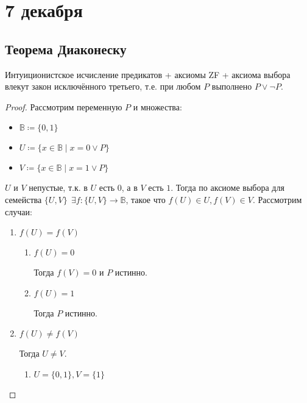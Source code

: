 \chapter{7 декабря}

\section{Теорема Диаконеску}

\begin{theorem}[Диаконеску]
    Интуиционистское исчисление предикатов + аксиомы ZF + аксиома выбора влекут закон исключённого третьего, т.е. при любом \(P\) выполнено \(P \lor \neg P\).
\end{theorem}

\begin{proof}
    Рассмотрим переменную \(P\) и множества:
    \begin{itemize}
        \item \(\mathbb{B} \coloneqq \{0, 1\}\)
        \item \(U \coloneqq \{x \in \mathbb{B} \mid x = 0 \lor P\}\)
        \item \(V \coloneqq \{x \in \mathbb{B} \mid x = 1 \lor P\}\)
    \end{itemize}


    \(U\) и \(V\) непустые, т.к. в \(U\) есть \(0\), а в \(V\) есть \(1\). Тогда по аксиоме выбора для семейства \(\{U, V\} \ \ \exists f : \{U, V\} \to \mathbb{B}\), такое что \(f(U) \in U, f(V) \in V\). Рассмотрим случаи:
    \begin{enumerate}
        \item \(f(U) = f(V)\)
              \begin{enumerate}
                  \item \(f(U) = 0\)

                        Тогда \(f(V) = 0\) и \(P\) истинно.
                  \item \(f(U) = 1\)

                        Тогда \(P\) истинно.
              \end{enumerate}
        \item \(f(U) \neq f(V)\)

              Тогда \(U \neq V\).

              \begin{enumerate}
                  \item \(U = \{0, 1\}, V = \{1\}\)


\end{enumerate}
\end{enumerate}
\end{proof}
